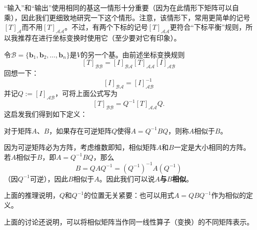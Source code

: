 “输入”和“输出”使用相同的基这一情形十分重要（因为在此情形下矩阵可以自乘），因此我们更细致地研究一下这个情形。注意，该情形下，常用更简单的记号$[T]_{\mathcal{A}}$而不用$[T]_{\mathcal{AA}}$。不过，有两个下标的记号$[T]_{\mathcal{AA}}$更符合“下标平衡”规则，所以我推荐在进行坐标变换时使用它（至少要对它有印象）。

令$\mathcal{B}=\{\mathbf{b}_{1},\mathbf{b}_{2},\ldots,\mathbf{b}_{n}\}$是$V$的另一个基。由前述坐标变换规则\[[T]_{\mathcal{BB}}=[I]_{\mathcal{BA}}[T]_{\mathcal{AA}}[I]_{\mathcal{AB}}\]
回想一下：\[[I]_{\mathcal{BA}}=[I]_{\mathcal{AB}}^{-1}\]
并记$Q:=[I]_{\mathcal{AB}}$，可将上面公式写为\[[T]_{\mathcal{BB}}=Q^{-1}[T]_{\mathcal{AA}}Q.\]
这启发我们得到如下定义：
\begin{definition}
  对于矩阵$A$、$B$，如果存在可逆矩阵$Q$使得$A=Q^{-1}BQ$，则称$A$相似于$B$。
\end{definition}

因为可逆矩阵必为方阵，考虑维数即知，相似矩阵$A$和$B$一定是大小相同的方阵。若$A$相似于$B$，即$A=Q^{-1}BQ$，那么\[B=QAQ^{-1}=(Q^{-1})^{-1}A(Q^{-1})\]
（因$Q^{-1}$可逆），因此$B$相似于$A$。因此我们可以说\textbf{$A$与$B$相似}。

上面的推理说明，$Q$和$Q^{-1}$的位置无关紧要：也可以用式$A=QBQ^{-1}$作为相似的定义。

上面的讨论还说明，可以将相似矩阵当作同一线性算子（变换）的不同矩阵表示。

